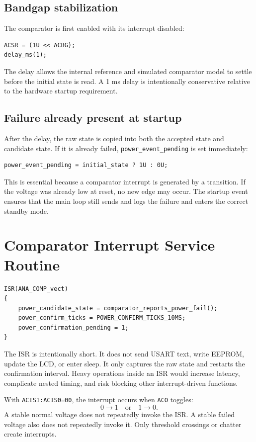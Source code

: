 \documentclass[11pt,a4paper]{article}
\begin{document}
\subsection{Bandgap stabilization}
The comparator is first enabled with its interrupt disabled:
\begin{lstlisting}[style=cstyle]
ACSR = (1U << ACBG);
delay_ms(1);
\end{lstlisting}
The delay allows the internal reference and simulated comparator model to settle before the initial state is read. A 1 ms delay is intentionally conservative relative to the hardware startup requirement.

\subsection{Failure already present at startup}
After the delay, the raw state is copied into both the accepted state and candidate state. If it is already failed, \texttt{power\_event\_pending} is set immediately:
\begin{lstlisting}[style=cstyle]
power_event_pending = initial_state ? 1U : 0U;
\end{lstlisting}
This is essential because a comparator interrupt is generated by a transition. If the voltage was already low at reset, no new edge may occur. The startup event ensures that the main loop still sends and logs the failure and enters the correct standby mode.

\section{Comparator Interrupt Service Routine}

\begin{lstlisting}[style=cstyle,caption={Comparator ISR.}]
ISR(ANA_COMP_vect)
{
    power_candidate_state = comparator_reports_power_fail();
    power_confirm_ticks = POWER_CONFIRM_TICKS_10MS;
    power_confirmation_pending = 1;
}
\end{lstlisting}

The ISR is intentionally short. It does not send USART text, write EEPROM, update the LCD, or enter sleep. It only captures the raw state and restarts the confirmation interval. Heavy operations inside an ISR would increase latency, complicate nested timing, and risk blocking other interrupt-driven functions.

With \texttt{ACIS1:ACIS0=00}, the interrupt occurs when \texttt{ACO} toggles:
\[
0\rightarrow1 \quad\text{or}\quad 1\rightarrow0.
\]
A stable normal voltage does not repeatedly invoke the ISR. A stable failed voltage also does not repeatedly invoke it. Only threshold crossings or chatter create interrupts.
\end{document}
